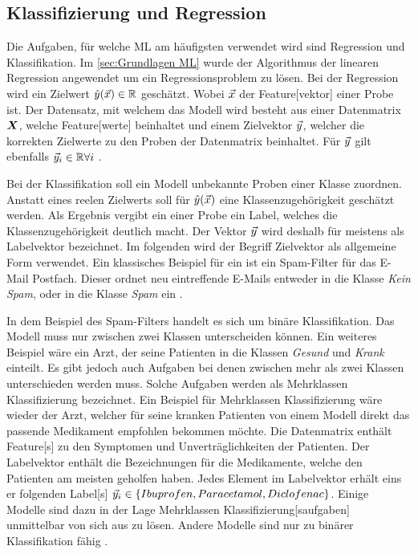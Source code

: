 \subsection{Klassifizierung und Regression} \label{sec:ML klass und Reg}
Die Aufgaben, für welche \gls{ML} am häufigsten verwendet wird sind Regression und \gls{Klassifikation}. Im \autoref{sec:Grundlagen ML} wurde der Algorithmus der linearen Regression angewendet um ein Regressionsproblem zu lösen. Bei der Regression wird ein Zielwert \(\hat{y}(\vec{x}) \in \mathbb{R}\) geschätzt. Wobei \(\vec{x}\) der \gls{Feature}[vektor] einer Probe ist. Der Datensatz, mit welchem das Modell  wird besteht aus einer \gls{Datenmatrix} \(\boldsymbol{X}\), welche \gls{Feature}[werte] beinhaltet und einem \gls{Zielvektor} \(\vec{y}\), welcher die korrekten Zielwerte zu den Proben der \gls{Datenmatrix} beinhaltet. Für \(\vec{y}\) gilt ebenfalls \(\vec{y}_i \in \mathbb{R} \forall i \) \cite{Burkov.2019, ShalevShwartz.2014}. \par

Bei der \gls{Klassifikation} soll ein Modell unbekannte Proben einer Klasse zuordnen. Anstatt eines reelen Zielwerts soll für \(\hat{y}(\vec{x})\) eine Klassenzugehörigkeit geschätzt werden. Als Ergebnis vergibt ein  einer Probe ein \gls{Label}, welches die Klassenzugehörigkeit deutlich macht. Der Vektor \(\vec{y}\) wird deshalb für  meistens als \gls{Labelvektor} bezeichnet. Im folgenden wird der Begriff \gls{Zielvektor} als allgemeine Form verwendet. Ein klassisches Beispiel für ein  ist ein Spam-Filter für das E-Mail Postfach. Dieser ordnet neu eintreffende E-Mails entweder in die Klasse \textit{Kein Spam}, oder in die Klasse \textit{Spam} ein \cite{Burkov.2019}. \par

In dem Beispiel des Spam-Filters handelt es sich um binäre \gls{Klassifikation}. Das Modell muss nur zwischen zwei Klassen unterscheiden können. Ein weiteres Beispiel wäre ein Arzt, der seine Patienten in die Klassen \textit{Gesund} und \textit{Krank} einteilt. Es gibt jedoch auch Aufgaben bei denen zwischen mehr als zwei Klassen unterschieden werden muss. Solche Aufgaben werden als \gls{Mehrklassen Klassifizierung} bezeichnet. Ein Beispiel für \gls{Mehrklassen Klassifizierung} wäre wieder der Arzt, welcher für seine kranken Patienten von einem Modell direkt das passende Medikament empfohlen bekommen möchte. Die \gls{Datenmatrix} enthält \gls{Feature}[s] zu den Symptomen und Unverträglichkeiten der Patienten. Der \gls{Labelvektor} enthält die Bezeichnungen für die Medikamente, welche den Patienten am meisten geholfen haben. Jedes Element im \gls{Labelvektor} erhält eins er folgenden \gls{Label}[s] \(\vec{y}_i \in \{Ibuprofen, Paracetamol, Diclofenac\}\). Einige Modelle sind dazu in der Lage \gls{Mehrklassen Klassifizierung}[saufgaben] unmittelbar von sich aus zu lösen. Andere Modelle sind nur zu binärer \gls{Klassifikation} fähig \cite{Burkov.2019}.\par

